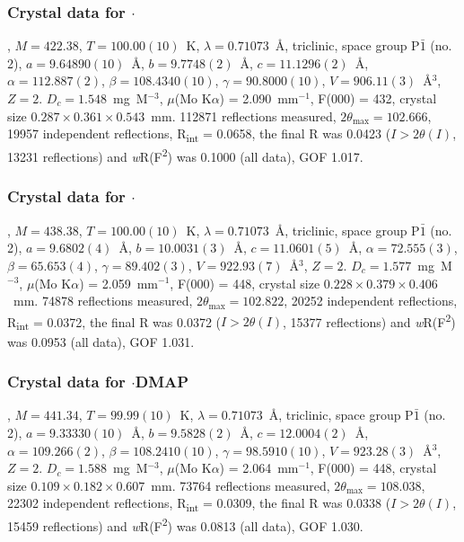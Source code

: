 \begin{refsection}
\subsubsection{Crystal data for \texorpdfstring{$\cdot$}{C22 H21 N3 O Se}}
, $M=422.38$, $T=100.00(10)$~K, $\lambda=0.71073$~\AA, triclinic, space group P$\bar{1}$ (no. 2), $a = 9.64890(10)$~\AA, $b = 9.7748(2)$~\AA, $c = 11.1296(2)$~\AA, $\alpha = 112.887(2)$\degree, $\beta = 108.4340(10)$\degree, $\gamma = 90.8000(10)$\degree, $V = 906.11(3)$~\AA$^{3}$, $Z = 2$. $D_{c}= 1.548$~mg~M$^{-3}$, $\mu$(Mo K$\alpha$) = 2.090~mm$^{-1}$, F(000) = 432, crystal size $0.287 \times 0.361 \times 0.543$~mm. 112871 reflections measured, $2\theta_{\mathrm{max}}=102.666$\degree, 19957 independent reflections, R\textsubscript{int} = 0.0658, the final R was 0.0423 ($I > 2\theta(I)$, 13231 reflections) and \emph{w}R(F\textsuperscript{2}) was 0.1000 (all data), GOF 1.017.

\subsubsection{Crystal data for \texorpdfstring{$\cdot$}{C22 H21 N3 O2 Se}}
, $M=438.38$, $T=100.00(10)$~K, $\lambda=0.71073$~\AA, triclinic, space group P$\bar{1}$ (no. 2), $a = 9.6802(4)$~\AA, $b = 10.0031(3)$~\AA, $c = 11.0601(5)$~\AA, $\alpha = 72.555(3)$\degree, $\beta = 65.653(4)$\degree, $\gamma = 89.402(3)$\degree, $V = 922.93(7)$~\AA$^{3}$, $Z = 2$. $D_{c}= 1.577$~mg~M$^{-3}$, $\mu$(Mo K$\alpha$) = 2.059~mm$^{-1}$, F(000) = 448, crystal size $0.228 \times 0.379 \times 0.406$~mm. 74878 reflections measured, $2\theta_{\mathrm{max}}=102.822$\degree, 20252 independent reflections, R\textsubscript{int} = 0.0372, the final R was 0.0372 ($I > 2\theta(I)$, 15377 reflections) and \emph{w}R(F\textsuperscript{2}) was 0.0953 (all data), GOF 1.031.

\subsubsection{Crystal data for \texorpdfstring{$\cdot$DMAP}{C20 H18 N4 O3 Se}}
, $M=441.34$, $T=99.99(10)$~K, $\lambda=0.71073$~\AA, triclinic, space group P$\bar{1}$ (no. 2), $a = 9.33330(10)$~\AA, $b = 9.5828(2)$~\AA, $c = 12.0004(2)$~\AA, $\alpha = 109.266(2)$\degree, $\beta = 108.2410(10)$\degree, $\gamma = 98.5910(10)$\degree, $V = 923.28(3)$~\AA$^{3}$, $Z = 2$. $D_{c}= 1.588$~mg~M$^{-3}$, $\mu$(Mo K$\alpha$) = 2.064~mm$^{-1}$, F(000) = 448, crystal size $0.109 \times 0.182 \times 0.607$~mm. 73764 reflections measured, $2\theta_{\mathrm{max}}=108.038$\degree, 22302 independent reflections, R\textsubscript{int} = 0.0309, the final R was 0.0338 ($I > 2\theta(I)$, 15459 reflections) and \emph{w}R(F\textsuperscript{2}) was 0.0813 (all data), GOF 1.030.


\end{refsection}
